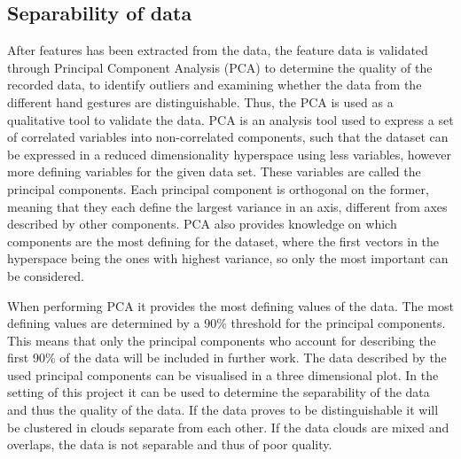 \subsection{Separability of data}


After features has been extracted from the data, the feature data is validated through Principal Component Analysis (PCA) to determine the quality of the recorded data, to identify outliers and examining whether the data from the different hand gestures are distinguishable. Thus, the PCA is used as a qualitative tool to validate the data. %
PCA is an analysis tool used to express a set of correlated variables into non-correlated components, such that the dataset can be expressed in a reduced dimensionality hyperspace using less variables, however more defining variables for the given data set. These variables are called the principal components. Each principal component is orthogonal on the former, meaning that they each define the largest variance in an axis, different from axes described by other components. PCA also provides knowledge on which components are the most defining for the dataset, where the first vectors in the hyperspace being the ones with highest variance, so only the most important can be considered. 

When performing PCA it provides the most defining values of the data. The most defining values are determined by a 90\% threshold for the principal components. This means that only the principal components who account for describing the first 90\% of the data will be included in further work. The data described by the used principal components can be visualised in a three dimensional plot. In the setting of this project it can be used to determine the separability of the data and thus the quality of the data. If the data proves to be distinguishable it will be clustered in clouds separate from each other. If the data clouds are mixed and overlaps, the data is not separable and thus of poor quality. 

